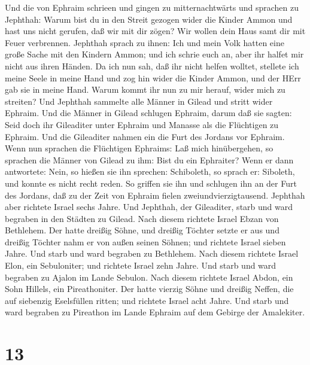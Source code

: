  Und die von Ephraim schrieen und gingen zu mitternachtwärts
und sprachen zu Jephthah: Warum bist du in den Streit gezogen wider die
Kinder Ammon und hast uns nicht gerufen, daß wir mit dir zögen? Wir
wollen dein Haus samt dir mit Feuer verbrennen.  Jephthah
sprach zu ihnen: Ich und mein Volk hatten eine große Sache mit den
Kindern Ammon; und ich schrie euch an, aber ihr halfet mir nicht aus
ihren Händen.  Da ich nun sah, daß ihr nicht helfen wolltet,
stellete ich meine Seele in meine Hand und zog hin wider die Kinder
Ammon, und der HErr gab sie in meine Hand. Warum kommt ihr nun zu mir
herauf, wider mich zu streiten?  Und Jephthah sammelte alle
Männer in Gilead und stritt wider Ephraim. Und die Männer in Gilead
schlugen Ephraim, darum daß sie sagten: Seid doch ihr Gileaditer unter
Ephraim und Manasse als die Flüchtigen zu Ephraim.  Und die
Gileaditer nahmen ein die Furt des Jordans vor Ephraim. Wenn nun
sprachen die Flüchtigen Ephraims: Laß mich hinübergehen, so sprachen die
Männer von Gilead zu ihm: Bist du ein Ephraiter? Wenn er dann
antwortete: Nein,  so hießen sie ihn sprechen: Schiboleth,
so sprach er: Siboleth, und konnte es nicht recht reden. So griffen sie
ihn und schlugen ihn an der Furt des Jordans, daß zu der Zeit von
Ephraim fielen zweiundvierzigtausend.  Jephthah aber
richtete Israel sechs Jahre. Und Jephthah, der Gileaditer, starb und
ward begraben in den Städten zu Gilead.  Nach diesem
richtete Israel Ebzan von Bethlehem.  Der hatte dreißig
Söhne, und dreißig Töchter setzte er aus und dreißig Töchter nahm er von
außen seinen Söhnen; und richtete Israel sieben Jahre.  Und
starb und ward begraben zu Bethlehem.  Nach diesem richtete
Israel Elon, ein Sebuloniter; und richtete Israel zehn Jahre.
 Und starb und ward begraben zu Ajalon im Lande Sebulon.
 Nach diesem richtete Israel Abdon, ein Sohn Hillels, ein
Pireathoniter.  Der hatte vierzig Söhne und dreißig Neffen,
die auf siebenzig Eselsfüllen ritten; und richtete Israel acht Jahre.
 Und starb und ward begraben zu Pireathon im Lande Ephraim
auf dem Gebirge der Amalekiter.

\hypertarget{section-12}{%
\section{13}\label{section-12}}

